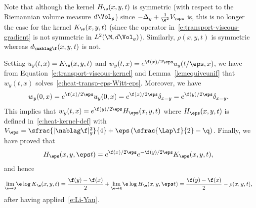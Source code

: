 Note that although the kernel $H_\e(x,y,t)$ is symmetric (with respect to the Riemannian volume measure $d\Vol_g$) since $-\Delta_g+\frac{1}{\e^2} V_\eps$ is, this is no longer the case for the kernel $K_\e(x,y,t)$ (since the operator in~\eqref{e:transport-viscous-gradient} is not symmetric in $L^2(\M,d\Vol_g)$). Similarly, $\rho(x,y,t)$ is symmetric whereas $d_{\nablag \f}(x,y,t)$ is not.

\bnp
Setting $u_y(t,x) = K_{\e}(x,y, t)$ and $w_y(t,x) = e^{\f(x)/2\eps} u_y(t/\eps,x)$, we have from Equation~\eqref{e:transport-viscous-kernel} and Lemma~\ref{lemequiveunif} that $w_y(t,x)$ solves~\eqref{e:heat-transp-eps-Witt-eps}. Moreover, we have
\[
w_y(0,x)= e^{\f(x)/2\eps} u_y(0,x)= e^{\f(x)/2\eps} \delta_{x=y} = e^{\f(y)/2\eps}\delta_{x=y}.
\]
This implies that $w_y (t,x) = e^{\f(y)/2\eps} H_\eps (x,y,t)$ where $H_\eps (x,y,t)$ is defined in~\eqref{e:heat-kernel-def} with $V_\eps = \sfrac{|\nablag \f|_g^2}{4} + \eps \left( \sfrac{\Lap \f}{2}- \q \right)$.
Finally, we have proved that
\[
H_\eps (x,y,\eps t) =e^{\f(x)/2\eps} e^{-\f(y)/2\eps} K_\eps (x,y,t),
\]
and hence
\[
\underset{\e\to 0}{\lim}\e \log K_{\e}(x,y, t)= \frac{\f(y)-\f(x)}{2} +\underset{\e\to 0}{\lim}\e \log H_{\e}(x,y,\eps t)
= \frac{\f(y)-\f(x)}{2} -\rho(x,y,t),
\]
after having applied~\eqref{e:Li-Yau}.
\enp

